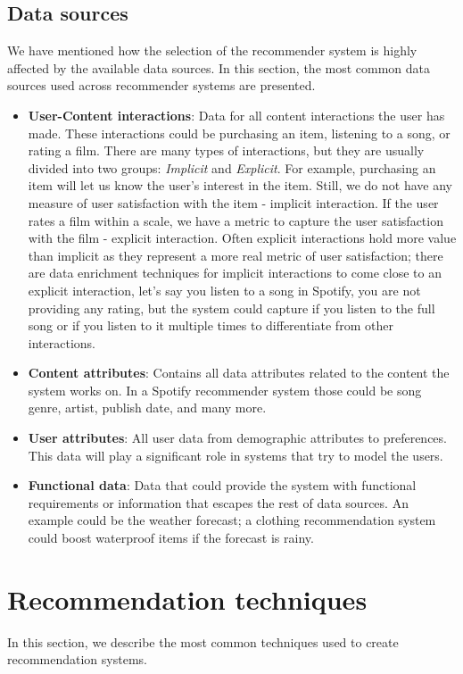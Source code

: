 \documentclass{tex_files/kththesis}
\begin{document}
\subsection{Data sources}

We have mentioned how the selection of the recommender system is highly affected by the available data sources. In this section, the most common data sources used across recommender systems are presented.

\begin{itemize}
    \item \textbf{User-Content interactions}: Data for all content interactions the user has made. These interactions could be purchasing an item, listening to a song, or rating a film. There are many types of interactions, but they are usually divided into two groups: \textit{Implicit} and \textit{Explicit}. For example, purchasing an item will let us know the user's interest in the item. Still, we do not have any measure of user satisfaction with the item - implicit interaction. If the user rates a film within a scale, we have a metric to capture the user satisfaction with the film - explicit interaction. Often explicit interactions hold more value than implicit as they represent a more real metric of user satisfaction; there are data enrichment techniques for implicit interactions to come close to an explicit interaction, let's say you listen to a song in Spotify, you are not providing any rating, but the system could capture if you listen to the full song or if you listen to it multiple times to differentiate from other interactions.
    \item \textbf{Content attributes}: Contains all data attributes related to the content the system works on. In a Spotify recommender system those could be song genre, artist, publish date, and many more.
    \item \textbf{User attributes}: All user data from demographic attributes to preferences. This data will play a significant role in systems that try to model the users.
    \item \textbf{Functional data}: Data that could provide the system with functional requirements or information that escapes the rest of data sources. An example could be the weather forecast; a clothing recommendation system could boost waterproof items if the forecast is rainy.
\end{itemize}

\section{Recommendation techniques}
In this section, we describe the most common techniques used to create recommendation systems.
\end{document}
